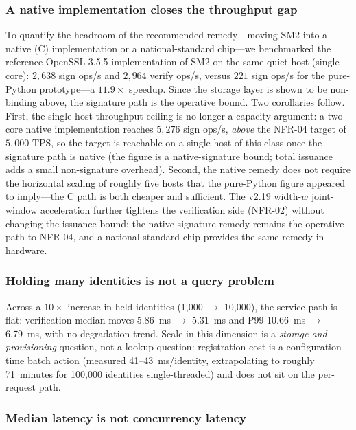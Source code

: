 \documentclass[10pt,twocolumn]{IEEEtran}
\begin{document}
\subsubsection*{A native implementation closes the throughput gap}
To quantify the headroom of the recommended remedy---moving SM2 into a
native (C) implementation or a national-standard chip---we benchmarked
the reference OpenSSL 3.5.5 implementation of SM2 on the same quiet
host (single core): $2{,}638$ sign ops/s and $2{,}964$ verify ops/s,
versus $221$ sign ops/s for the pure-Python prototype---a
$11.9\times$ speedup. Since the storage layer is shown to be
non-binding above, the signature path is the operative bound. Two
corollaries follow. First, the single-host throughput ceiling is no
longer a capacity argument: a two-core native implementation reaches
$5{,}276$ sign ops/s, \emph{above} the NFR-04 target of $5{,}000$
TPS, so the target is reachable on a single host of this class once
the signature path is native (the figure is a native-signature bound;
total issuance adds a small non-signature overhead). Second, the
native remedy does not require the horizontal scaling of roughly five
hosts that the pure-Python figure appeared to imply---the C path is
both cheaper and sufficient. The v2.19 width-$w$ joint-window
acceleration further tightens the verification side (NFR-02) without
changing the issuance bound; the native-signature remedy remains the
operative path to NFR-04, and a national-standard chip provides the
same remedy in hardware.

\subsubsection*{Holding many identities is not a query problem}

Across a $10\times$ increase in held identities (1,000 $\rightarrow$
10,000), the service path is flat: verification median moves 5.86~ms
$\rightarrow$ 5.31~ms and P99 10.66~ms $\rightarrow$ 6.79~ms, with no
degradation trend. Scale in this dimension is a \emph{storage and
provisioning} question, not a lookup question: registration cost is a
configuration-time batch action (measured 41--43~ms/identity, extrapolating
to roughly 71~minutes for 100,000 identities single-threaded) and does not
sit on the per-request path.

\subsubsection*{Median latency is not concurrency latency}
\end{document}

